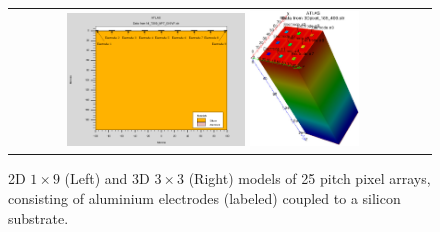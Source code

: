 \begin{figure}[!htb]
  \begin{center}
    \begin{tabular}{cc}
      \includegraphics[width=0.45\textwidth]{fig_FastTiming/Materials.png}
      \includegraphics[width=0.275\textwidth]{fig_FastTiming/Model3D.png}
    \end{tabular}
    \caption{2D $1 \times 9$ (Left) and 3D $3 \times 3$ (Right) models of \SI{25}{\micron} pitch pixel arrays, consisting of aluminium electrodes (labeled) coupled to a silicon substrate.
            }
    \label{Materials_Model}
  \end{center}
\end{figure}

